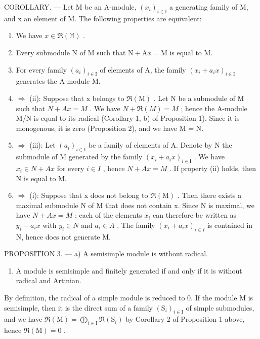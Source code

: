 COROLLARY. --- Let M be an A-module, \((x_{i})_{i\in\mathbb{I}}\) a generating family of M, and x an element of M. The following properties are equivalent:

\begin{enumerate}
\def\labelenumi{(\roman{enumi})}
\item
  We have \(x \in \Re(\mathbb{M})\) .
\item
  Every submodule N of M such that \(\mathrm{N} + \mathrm{A}x = \mathrm{M}\) is equal to M.
\item
  For every family \((a_{i})_{i\in\mathrm{I}}\) of elements of A, the family \((x_{i}+a_{i}x)_{i\in\mathrm{I}}\) generates the A-module M.
\item
  \(\Rightarrow\) (ii): Suppose that x belongs to \(\Re(\mathrm{M})\) . Let N be a submodule of M such that \(N + Ax = M\) . We have \(N + \Re(M) = M\) ; hence the A-module M/N is equal to its radical (Corollary 1, b) of Proposition 1). Since it is monogenous, it is zero (Proposition 2), and we have M = N.
\item
  \(\Rightarrow\) (iii): Let \((a_{i})_{i\in\mathrm{I}}\) be a family of elements of A. Denote by N the submodule of M generated by the family \((x_{i}+a_{i}x)_{i\in\mathrm{I}}\) . We have \(x_{i}\in N+Ax\) for every \(i\in I\) , hence \(N+Ax=M\) . If property (ii) holds, then N is equal to M.
\item
  \(\Rightarrow\) (i): Suppose that x does not belong to \(\Re(\mathrm{M})\) . Then there exists a maximal submodule N of M that does not contain x. Since N is maximal, we have \(N + Ax = M\) ; each of the elements \(x_{i}\) can therefore be written as \(y_{i} - a_{i}x\) with \(y_{i} \in N\) and \(a_{i} \in A\) . The family \((x_{i} + a_{i}x)_{i \in I}\) is contained in N, hence does not generate M.
\end{enumerate}

PROPOSITION 3. --- a) A semisimple module is without radical.

\begin{enumerate}
\def\labelenumi{\alph{enumi})}
\setcounter{enumi}{1}
\tightlist
\item
  A module is semisimple and finitely generated if and only if it is without radical and Artinian.
\end{enumerate}

By definition, the radical of a simple module is reduced to 0. If the module M is semisimple, then it is the direct sum of a family \((\mathrm{S}_{i})_{i\in\mathrm{I}}\) of simple submodules, and we have \(\mathfrak{R}(\mathrm{M})=\bigoplus_{i\in\mathrm{I}}\mathfrak{R}(\mathrm{S}_{i})\) by Corollary 2 of Proposition 1 above, hence \(\mathfrak{R}(\mathrm{M})=0\) .

